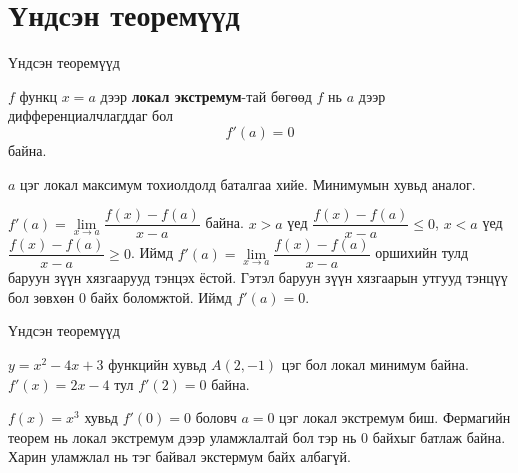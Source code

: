 \section{Үндсэн теоремүүд}
\begin{frame}[allowframebreaks]{Үндсэн теоремүүд}
\begin{theorem}[Ферма]
$f$ функц $x=a$ дээр \textbf{локал экстремум}-тай бөгөөд $f$ нь $a$ дээр дифференциалчлагддаг бол
\[
f'(a)=0
\] байна.
\end{theorem}

\begin{prof} 
$a$ цэг локал максимум тохиолдолд баталгаа хийе. Минимумын хувьд аналог. 

$f'(a)=\lim\limits_{x\to a} \dfrac{f(x)-f(a)}{x-a}$ байна. 
$x>a$ үед $\dfrac{f(x)-f(a)}{x-a}\le 0$, $x<a$ үед $\dfrac{f(x)-f(a)}{x-a}\ge 0$. Иймд $f'(a)=\lim\limits_{x\to a} \dfrac{f(x)-f(a)}{x-a}$  оршихийн тулд баруун зүүн хязгаарууд тэнцэх ёстой. Гэтэл баруун зүүн  хязгаарын утгууд тэнцүү бол зөвхөн $0$ байх боломжтой. Иймд $f'(a)=0$. 
\end{prof}
\end{frame}

\begin{frame}[allowframebreaks]{Үндсэн теоремүүд}
\begin{example}
$y=x^2-4x+3$ функцийн хувьд $A(2,-1)$ цэг бол локал минимум байна. $f'(x)=2x-4$ тул $f'(2)=0$ байна.
\begin{center}
\begin{fitbox}\end{fitbox}
\end{center}
$f(x)=x^3$ хувьд $f'(0)=0$ боловч $a=0$ цэг локал экстремум биш. Фермагийн теорем нь локал экстремум дээр уламжлалтай бол тэр нь $0$ байхыг батлаж байна. Харин уламжлал нь тэг байвал экстермум байх албагүй.
\begin{center}
\begin{fitbox}\end{fitbox}
\end{center}

\end{example}
\end{frame}

